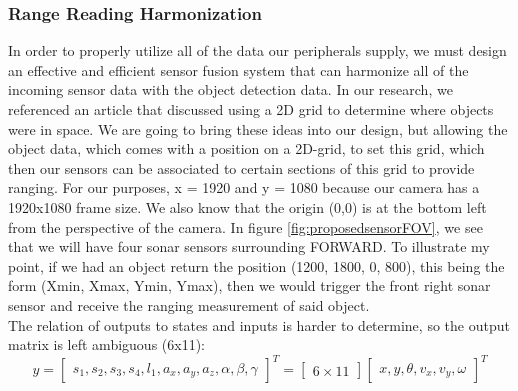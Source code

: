 \subsubsection{Range Reading Harmonization} \label{harmony}
\noindent In order to properly utilize all of the data our peripherals supply, we must design an effective and efficient sensor fusion system that can harmonize all of the incoming sensor data with the object detection data. In our research, we referenced an article \cite{CVRef2} that discussed using a 2D grid to determine where objects were in space. We are going to bring these ideas into our design, but allowing the object data, which comes with a position on a 2D-grid, to set this grid, which then our sensors can be associated to certain sections of this grid to provide ranging. For our purposes, x = 1920 and y = 1080 because our camera has a 1920x1080 frame size. We also know that the origin (0,0) is at the bottom left from the perspective of the camera. In figure \ref{fig:proposedsensorFOV}, we see that we will have four sonar sensors surrounding FORWARD. To illustrate my point, if we had an object return the position (1200, 1800, 0, 800), this being the form (Xmin, Xmax, Ymin, Ymax), then we would trigger the front right sonar sensor and receive the ranging measurement of said object. \\

\noindent The relation of outputs to states and inputs is harder to determine, so the output matrix is left ambiguous (6x11):
\[y =
\begin{bmatrix}
	s_1, s_2, s_3, s_4, l_1, a_x, a_y, a_z, \alpha, \beta, \gamma
\end{bmatrix}^T = 
\begin{bmatrix}
	6\times 11
\end{bmatrix}
\begin{bmatrix}
	x, y, \theta, v_x, v_y, \omega
\end{bmatrix}^T
\]



